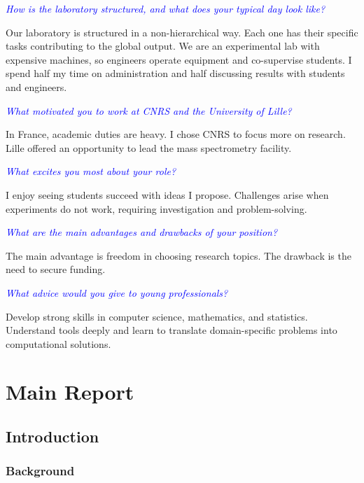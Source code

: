 \documentclass[12pt,a4paper]{report}
\newcommand{\question}[1]{\par\noindent\textcolor{blue}{\textit{#1}}\par}
\newcommand{\answer}[1]{\noindent #1\par\vspace{0.6em}}
\begin{document}
\question{How is the laboratory structured, and what does your typical day look like?}
\answer{Our laboratory is structured in a non-hierarchical way. Each one has their specific tasks contributing to the global output. We are an experimental lab with expensive machines, so engineers operate equipment and co-supervise students. I spend half my time on administration and half discussing results with students and engineers.}

\question{What motivated you to work at CNRS and the University of Lille?}
\answer{In France, academic duties are heavy. I chose CNRS to focus more on research. Lille offered an opportunity to lead the mass spectrometry facility.}

\question{What excites you most about your role?}
\answer{I enjoy seeing students succeed with ideas I propose. Challenges arise when experiments do not work, requiring investigation and problem-solving.}

\question{What are the main advantages and drawbacks of your position?}
\answer{The main advantage is freedom in choosing research topics. The drawback is the need to secure funding.}

\question{What advice would you give to young professionals?}
\answer{Develop strong skills in computer science, mathematics, and statistics. Understand tools deeply and learn to translate domain-specific problems into computational solutions.}

\chapter{Main Report}
\section{Introduction}
\subsection{Background}
\end{document}

